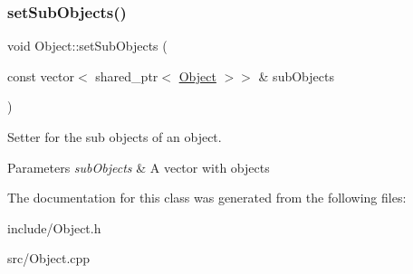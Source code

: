\subsubsection{\texorpdfstring{set\+Sub\+Objects()}{setSubObjects()}}
{\footnotesize\ttfamily void Object\+::set\+Sub\+Objects (\begin{DoxyParamCaption}\item[{const vector$<$ shared\+\_\+ptr$<$ \hyperlink{classObject}{Object} $>$$>$ \&}]{sub\+Objects }\end{DoxyParamCaption})}



Setter for the sub objects of an object. 


\begin{DoxyParams}{Parameters}
{\em sub\+Objects} & A vector with objects \\
\hline
\end{DoxyParams}


The documentation for this class was generated from the following files\+:\begin{DoxyCompactItemize}
\item 
include/Object.\+h\item 
src/Object.\+cpp\end{DoxyCompactItemize}

